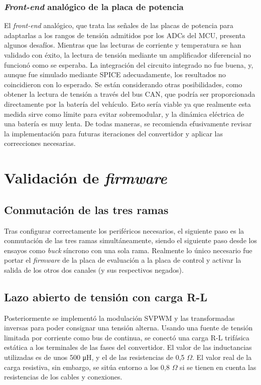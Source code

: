 \subsubsection{\textit{Front-end} analógico de la placa de potencia}

El \textit{front-end} analógico, que trata las señales de las placas de potencia para adaptarlas a los rangos de tensión admitidos por los ADCs del MCU, presenta algunos desafíos. Mientras que las lecturas de corriente y temperatura se han validado con éxito, la lectura de tensión mediante un amplificador diferencial no funcionó como se esperaba. La integración del circuito integrado no fue buena, y, aunque fue simulado mediante SPICE adecuadamente, los resultados no coincidieron con lo esperado. Se están considerando otras posibilidades, como obtener la lectura de tensión a través del bus CAN, que podría ser proporcionada directamente por la batería del vehículo. Esto sería viable ya que realmente esta medida sirve como límite para evitar sobremodular, y la dinámica eléctrica de una batería es muy lenta. De todas maneras, se recomienda efusivamente revisar la implementación para futuras iteraciones del convertidor y aplicar las correcciones necesarias.

\section{Validación de \textit{firmware}}

\subsection{Conmutación de las tres ramas}

Tras configurar correctamente los periféricos necesarios, el siguiente paso es la conmutación de las tres ramas simultáneamente, siendo el siguiente paso desde los ensayos como \textit{buck} síncrono con una sola rama. Realmente lo único necesario fue portar el \textit{firmware} de la placa de evaluación a la placa de control y activar la salida de los otros dos canales (y sus respectivos negados).


\subsection{Lazo abierto de tensión con carga R-L}

Posteriormente se implementó la modulación SVPWM y las transformadas inversas para poder consignar una tensión alterna. Usando una fuente de tensión limitada por corriente como bus de continua, se conectó una carga R-L trifásica estática a los terminales de las fases del convertidor. El valor de las inductancias utilizadas es de unos 500 \unit{\micro\henry}, y el de las resistencias de 0,5 $\Omega$. El valor real de la carga resistiva, sin embargo, se sitúa entorno a los 0,8 $\Omega$ si se tienen en cuenta las resistencias de los cables y conexiones.

